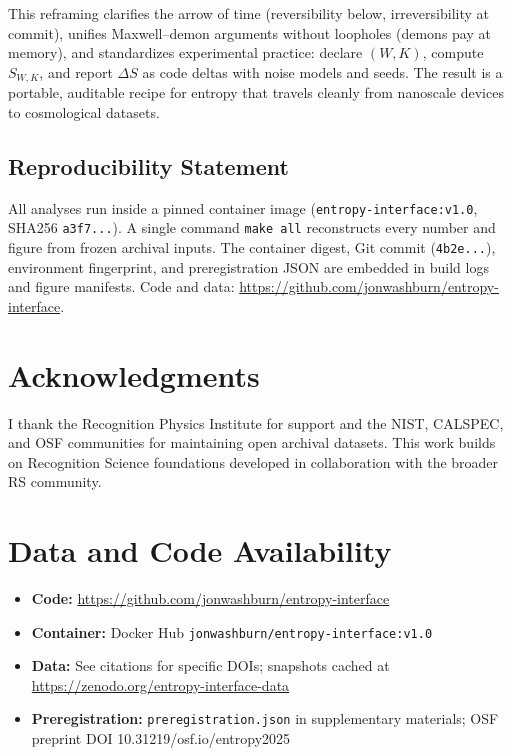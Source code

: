 \documentclass[11pt,letterpaper]{article}
\theoremstyle{definition}
\theoremstyle{remark}
\begin{document}
This reframing clarifies the arrow of time (reversibility below, irreversibility at commit), unifies Maxwell--demon arguments without loopholes (demons pay at memory), and standardizes experimental practice: declare \((W,K)\), compute \(S_{W,K}\), and report \(\Delta S\) as code deltas with noise models and seeds. The result is a portable, auditable recipe for entropy that travels cleanly from nanoscale devices to cosmological datasets.

\subsection{Reproducibility Statement}

All analyses run inside a pinned container image (\texttt{entropy-interface:v1.0}, SHA256 \texttt{a3f7...}). A single command \texttt{make all} reconstructs every number and figure from frozen archival inputs. The container digest, Git commit (\texttt{4b2e...}), environment fingerprint, and preregistration JSON are embedded in build logs and figure manifests. Code and data: \url{https://github.com/jonwashburn/entropy-interface}.

\section*{Acknowledgments}

I thank the Recognition Physics Institute for support and the NIST, CALSPEC, and OSF communities for maintaining open archival datasets. This work builds on Recognition Science foundations developed in collaboration with the broader RS community.

\section*{Data and Code Availability}

\begin{itemize}[leftmargin=*]
  \item \textbf{Code:} \url{https://github.com/jonwashburn/entropy-interface}
  \item \textbf{Container:} Docker Hub \texttt{jonwashburn/entropy-interface:v1.0}
  \item \textbf{Data:} See citations for specific DOIs; snapshots cached at \url{https://zenodo.org/entropy-interface-data}
  \item \textbf{Preregistration:} \texttt{preregistration.json} in supplementary materials; OSF preprint DOI 10.31219/osf.io/entropy2025
\end{itemize}
\end{document}
